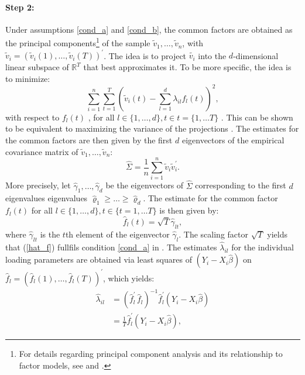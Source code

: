 \paragraph{Step 2:}\label{step2} Under assumptions \ref{cond_a} and \ref{cond_b}, the common factors are obtained as the principal components\footnote{For details regarding principal component analysis and its relationship to factor models, see \citet{shalizi2016advanced} and \citet{hansen2022econometrics}.} of the sample $\tilde{v}_1, \ldots, \tilde{v}_n$, with $\tilde{v}_i = (\tilde{v}_i(1), \ldots, \tilde{v}_i(T))^\prime$. The idea is to project $\tilde{v_i}$ into the $d$-dimensional linear subspace of $\mathbb{R}^T$ that best approximates it. To be more specific, the idea is to minimize:
\begin{equation}
     \sum_{i=1}^n \sum_{t=1}^T \left(\tilde{v}_i(t) -\sum_{l=1}^d \lambda_{il}f_l(t) \right)^2,
\end{equation}
with respect to $f_l(t)$ , for all $l \in\{1, \ldots, d\}, t \in t = \{ 1, \ldots T\}$ \citep{rao1958some, stock2002forecasting, bai2009panel}. This can be shown to be equivalent to maximizing the variance of the projections \citep{shalizi2016advanced}.  The estimates for the common factors are then given by the first $d$ eigenvectors of the empirical covariance matrix of $\tilde{v}_1, \ldots, \tilde{v}_n$:
\begin{equation}\label{empirical_covar}
    \hat{\Sigma} = \frac{1}{n} \sum_{i=1}^n \tilde{v}_i \tilde{v}_i^\prime.
\end{equation}
More precisely, let $\hat{\gamma}_1, \ldots, \hat{\gamma}_d$ be the eigenvectors of $\hat{\Sigma}$ corresponding to the first $d$ eigenvalues eigenvalues $\hat{\varrho}_1 \geq \ldots \geq \hat{\varrho}_d$. The estimate for the common factor $f_l(t)$ for all $l \in\{1, \ldots, d\}, t \in \{t = 1, \ldots T\}$ is then given by: 
\begin{equation}\label{hat_f}
    \hat{f}_l(t) = \sqrt{T} \hat{\gamma}_{lt},
\end{equation}
where $\hat{\gamma}_{lt}$ is the $t$th element of the eigenvector $\hat{\gamma}_l$. The scaling factor $\sqrt{T}$ yields that (\ref{hat_f}) fullfils condition \ref{cond_a} in . The estimates $\hat{\lambda}_{il}$ for the individual loading parameters are obtained via least squares of $(Y_i - X_i \hat{\beta})$ on $\hat{f}_l = (\hat{f}_l(1), \ldots, \hat{f}_l(T))^\prime$, which yields:
\begin{equation}
\begin{aligned}
    \hat{\lambda}_{i l} & = \left(\hat{f}_l^\prime \,\hat{f}_l \right)^{-1} \hat{f}_l^{\prime}\left(Y_i-X_i \hat{\beta}\right) \\
    & = \frac{1}{T} \hat{f}_l^{\prime}\left(Y_i-X_i \hat{\beta}\right) ,
\end{aligned}
\end{equation}
